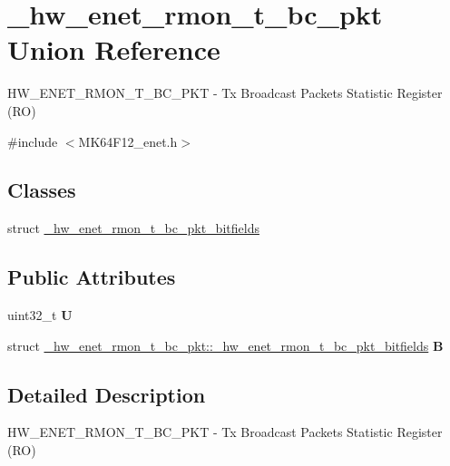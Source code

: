 \hypertarget{union__hw__enet__rmon__t__bc__pkt}{}\section{\+\_\+hw\+\_\+enet\+\_\+rmon\+\_\+t\+\_\+bc\+\_\+pkt Union Reference}
\label{union__hw__enet__rmon__t__bc__pkt}


H\+W\+\_\+\+E\+N\+E\+T\+\_\+\+R\+M\+O\+N\+\_\+\+T\+\_\+\+B\+C\+\_\+\+P\+KT -\/ Tx Broadcast Packets Statistic Register (RO)  




{\ttfamily \#include $<$M\+K64\+F12\+\_\+enet.\+h$>$}

\subsection*{Classes}
\begin{DoxyCompactItemize}
\item 
struct \hyperlink{struct__hw__enet__rmon__t__bc__pkt_1_1__hw__enet__rmon__t__bc__pkt__bitfields}{\+\_\+hw\+\_\+enet\+\_\+rmon\+\_\+t\+\_\+bc\+\_\+pkt\+\_\+bitfields}
\end{DoxyCompactItemize}
\subsection*{Public Attributes}
\begin{DoxyCompactItemize}
\item 
uint32\+\_\+t {\bfseries U}\hypertarget{union__hw__enet__rmon__t__bc__pkt_a94cb2a065fcd6c7a20db75cde6c7e70d}{}\label{union__hw__enet__rmon__t__bc__pkt_a94cb2a065fcd6c7a20db75cde6c7e70d}

\item 
struct \hyperlink{struct__hw__enet__rmon__t__bc__pkt_1_1__hw__enet__rmon__t__bc__pkt__bitfields}{\+\_\+hw\+\_\+enet\+\_\+rmon\+\_\+t\+\_\+bc\+\_\+pkt\+::\+\_\+hw\+\_\+enet\+\_\+rmon\+\_\+t\+\_\+bc\+\_\+pkt\+\_\+bitfields} {\bfseries B}\hypertarget{union__hw__enet__rmon__t__bc__pkt_a1fca0a8db1845c66a43538042ce03e6a}{}\label{union__hw__enet__rmon__t__bc__pkt_a1fca0a8db1845c66a43538042ce03e6a}

\end{DoxyCompactItemize}


\subsection{Detailed Description}
H\+W\+\_\+\+E\+N\+E\+T\+\_\+\+R\+M\+O\+N\+\_\+\+T\+\_\+\+B\+C\+\_\+\+P\+KT -\/ Tx Broadcast Packets Statistic Register (RO) 

